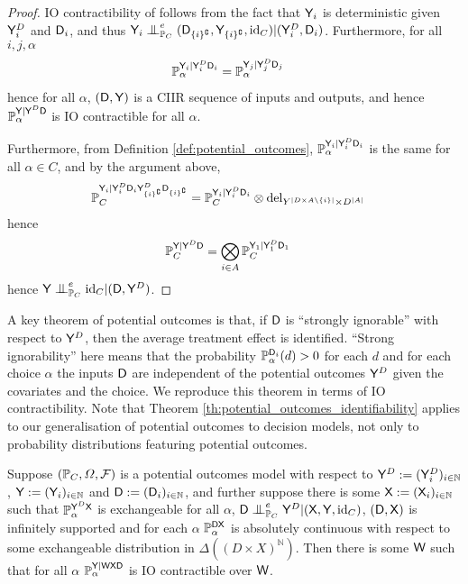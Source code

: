 \begin{proof}
IO contractibility of  follows from the fact that $\mathsf{Y}_i$ is deterministic given $\mathsf{Y}^D_i$ and $\mathsf{D}_i$, and thus $\RV{Y}_i\CI^e_{\prob{P}_C} (\RV{D}_{\{i\}^{\complement}},\RV{Y}_{\{i\}^{\complement}},\text{id}_C)|(\RV{Y}^D_{i},\RV{D}_i)$. Furthermore, for all $i,j,\alpha$
\begin{align}
    \mathbb{P}_\alpha^{\mathsf{Y}_i|\mathsf{Y}^D_i\mathsf{D}_i} &= \mathbb{P}_\alpha^{\mathsf{Y}_j|\mathsf{Y}^D_j\mathsf{D}_j}
\end{align}
hence for all $\alpha$, $(\mathsf{D},\mathsf{Y})$ is a CIIR sequence of inputs and outputs, and hence $\mathbb{P}_\alpha^{\mathsf{Y}|\mathsf{Y}^D\mathsf{D}}$ is IO contractible for all $\alpha$.

Furthermore, from Definition \ref{def:potential_outcomes}, $\mathbb{P}_\alpha^{\mathsf{Y}_i|\mathsf{Y}^D_i\mathsf{D}_i}$ is the same for all $\alpha\in C$, and by the argument above,
\begin{align}
    \mathbb{P}_C^{\mathsf{Y}_i|\mathsf{Y}^D_i\mathsf{D}_i\mathsf{Y}^D_{\{i\}^{\complement}}\mathsf{D}_{\{i\}^{\complement}}} &= \mathbb{P}_C^{\mathsf{Y}_i|\mathsf{Y}^D_i\mathsf{D}_i}\otimes \mathrm{del}_{Y^{|D\times A\setminus\{i\}|}\times D^{|A|}}
\end{align}
hence
\begin{align}
    \mathbb{P}_C^{\mathsf{Y}|\mathsf{Y}^D\mathsf{D}} &= \bigotimes_{i\in A} \mathbb{P}_C^{\mathsf{Y}_1|\mathsf{Y}^D_1\mathsf{D}_1}
\end{align}
hence $\RV{Y}\CI_{\prob{P}_C}^e\text{id}_C|(\RV{D},\RV{Y}^D)$.
\end{proof}

A key theorem of potential outcomes is that, if $\mathsf{D}$ is ``strongly ignorable'' with respect to $\mathsf{Y}^D$, then the average treatment effect is identified. ``Strong ignorability'' here means that the probability $\mathbb{P}_\alpha^{\mathsf{D}_i}(d)>0$ for each $d$ and for each choice $\alpha$ the inputs $\mathsf{D}$ are independent of the potential outcomes $\mathsf{Y}^D$ given the covariates and the choice. We reproduce this theorem in terms of IO contractibility. Note that Theorem \ref{th:potential_outcomes_identifiability} applies to our generalisation of potential outcomes to decision models, not only to probability distributions featuring potential outcomes.

\begin{theorem}\label{th:potential_outcomes_identifiability}
Suppose $(\mathbb{P}_C,\Omega,\mathcal{F})$ is a potential outcomes model with respect to $\mathsf{Y}^D:=(\mathsf{Y}^D_i)_{i\in \mathbb{N}}$, $\mathsf{Y}:=(\mathsf{Y}_i)_{i\in \mathbb{N}}$ and $\mathsf{D}:=(\mathsf{D}_i)_{i\in \mathbb{N}}$, and further suppose there is some $\mathsf{X}:= (\mathsf{X}_i)_{i\in \mathbb{N}}$ such that $\mathbb{P}_\alpha^{\mathsf{Y}^D\mathsf{X}}$ is exchangeable for all $\alpha$, $\RV{D} \CI^e_{\prob{P}_C} \RV{Y}^D | (\RV{X},\RV{Y},\text{id}_C)$, $(\mathsf{D},\mathsf{X})$ is infinitely supported and for each $\alpha$ $\mathbb{P}_\alpha^{\mathsf{DX}}$ is absolutely continuous with respect to some exchangeable distribution in $\Delta((D\times X)^{\mathbb{N}})$. Then there is some $\mathsf{W}$ such that for all $\alpha$ $\mathbb{P}_\alpha^{\mathsf{Y}|\mathsf{WXD}}$ is IO contractible over $\mathsf{W}$.
\end{theorem}

